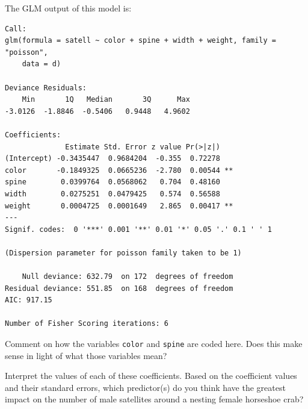 \noindent The GLM output of this model is:

{\small
\begin{verbatim}
Call:
glm(formula = satell ~ color + spine + width + weight, family = "poisson", 
    data = d)

Deviance Residuals: 
    Min       1Q   Median       3Q      Max  
-3.0126  -1.8846  -0.5406   0.9448   4.9602  

Coefficients:
              Estimate Std. Error z value Pr(>|z|)   
(Intercept) -0.3435447  0.9684204  -0.355  0.72278   
color       -0.1849325  0.0665236  -2.780  0.00544 **
spine        0.0399764  0.0568062   0.704  0.48160   
width        0.0275251  0.0479425   0.574  0.56588   
weight       0.0004725  0.0001649   2.865  0.00417 **
---
Signif. codes:  0 '***' 0.001 '**' 0.01 '*' 0.05 '.' 0.1 ' ' 1

(Dispersion parameter for poisson family taken to be 1)

    Null deviance: 632.79  on 172  degrees of freedom
Residual deviance: 551.85  on 168  degrees of freedom
AIC: 917.15

Number of Fisher Scoring iterations: 6
\end{verbatim}
}

\begin{question}{}
Comment on how the variables \texttt{color} and \texttt{spine} are coded here. Does this make sense in light of what those variables mean?
\end{question}

\begin{question}{}
Interpret the values of each of these coefficients. Based on the coefficient values and their standard errors, which predictor(s) do you think have the greatest impact on the number of male satellites around a nesting female horseshoe crab? 
\end{question}

